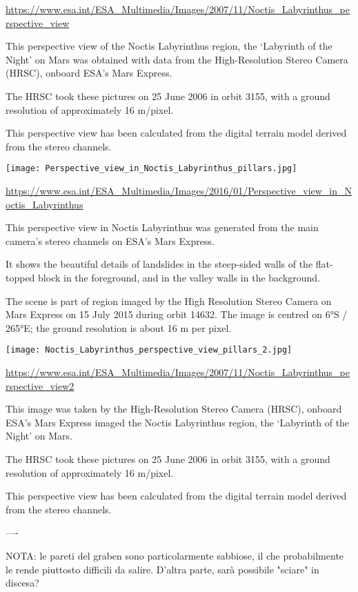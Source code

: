 \documentclass[a4paper,10pt,openany,oneside]{memoir}
\begin{document}
\url{https://www.esa.int/ESA_Multimedia/Images/2007/11/Noctis_Labyrinthus_perspective_view}


This perspective view of the Noctis Labyrinthus region, the ‘Labyrinth of the Night’ on Mars was obtained with data from the High-Resolution Stereo Camera (HRSC), onboard ESA’s Mars Express.

The HRSC took these pictures on 25 June 2006 in orbit 3155, with a ground resolution of approximately 16 m/pixel.

This perspective view has been calculated from the digital terrain model derived from the stereo channels.


\texttt{[image: Perspective\_view\_in\_Noctis\_Labyrinthus\_pillars.jpg]}

\url{https://www.esa.int/ESA_Multimedia/Images/2016/01/Perspective_view_in_Noctis_Labyrinthus}


This perspective view in Noctis Labyrinthus was generated from the main camera’s stereo channels on ESA’s Mars Express.

It shows the beautiful details of landslides in the steep-sided walls of the flat-topped block in the foreground, and in the valley walls in the background.

The scene is part of region imaged by the High Resolution Stereo Camera on Mars Express on 15 July 2015 during orbit 14632. The image is centred on 6°S / 265°E; the ground resolution is about 16 m per pixel.



\texttt{[image: Noctis\_Labyrinthus\_perspective\_view\_pillars\_2.jpg]}

\url{https://www.esa.int/ESA_Multimedia/Images/2007/11/Noctis_Labyrinthus_perspective_view2}

This image was taken by the High-Resolution Stereo Camera (HRSC), onboard ESA’s Mars Express imaged the Noctis Labyrinthus region, the ‘Labyrinth of the Night’ on Mars.

The HRSC took these pictures on 25 June 2006 in orbit 3155, with a ground resolution of approximately 16 m/pixel.

This perspective view has been calculated from the digital terrain model derived from the stereo channels.


----

NOTA: le pareti del graben sono particolarmente sabbiose, il che probabilmente le rende piuttosto difficili da salire. D'altra parte, sarà possibile "sciare" in discesa?
\end{document}
